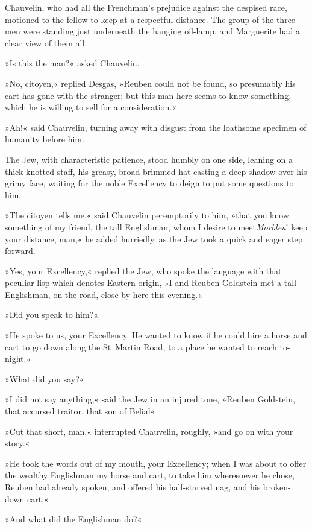 Chauvelin, who had all the Frenchman's prejudice against the despised race, motioned to the fellow to keep at a respectful distance. The group of the three men were standing just underneath the hanging oil-lamp, and Marguerite had a clear view of them all.

»Is this the man?« asked Chauvelin.

»No, citoyen,« replied Desgas, »Reuben could not be found, so presumably his cart has gone with the stranger; but this man here seems to know something, which he is willing to sell for a consideration.«

»Ah!« said Chauvelin, turning away with disgust from the loathsome specimen of humanity before him.

The Jew, with characteristic patience, stood humbly on one side, leaning on a thick knotted staff, his greasy, broad-brimmed hat casting a deep shadow over his grimy face, waiting for the noble Excellency to deign to put some questions to him.

»The citoyen tells me,« said Chauvelin peremptorily to him, »that you know something of my friend, the tall Englishman, whom I desire to meet\textellipsis \allowbreak  \textit{Morbleu}! keep your distance, man,« he added hurriedly, as the Jew took a quick and eager step forward.

»Yes, your Excellency,« replied the Jew, who spoke the language with that peculiar lisp which denotes Eastern origin, »I and Reuben Goldstein met a tall Englishman, on the road, close by here this evening.«

»Did you speak to him?«

»He spoke to us, your Excellency. He wanted to know if he could hire a horse and cart to go down along the St~Martin Road, to a place he wanted to reach to-night.«

»What did you say?«

»I did not say anything,« said the Jew in an injured tone, »Reuben Goldstein, that accursed traitor, that son of Belial\textellipsis«

»Cut that short, man,« interrupted Chauvelin, roughly, »and go on with your story.«

»He took the words out of my mouth, your Excellency; when I was about to offer the wealthy Englishman my horse and cart, to take him wheresoever he chose, Reuben had already spoken, and offered his half-starved nag, and his broken-down cart.«

»And what did the Englishman do?«

